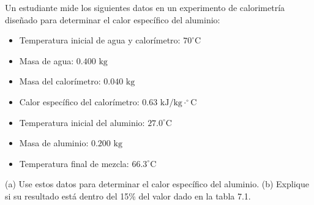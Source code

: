 \item Un estudiante mide los siguientes datos en un experimento de calorimetría diseñado para determinar el calor específico del aluminio:
\begin{itemize}
    \item Temperatura inicial de agua y calorímetro: $70^\circ\text{C}$
    \item Masa de agua: $0.400\text{ kg}$
    \item Masa del calorímetro: $0.040\text{ kg}$
    \item Calor específico del calorímetro: $0.63\text{ kJ/kg}\cdot^\circ\text{C}$
    \item Temperatura inicial del aluminio: $27.0^\circ\text{C}$
    \item Masa de aluminio: $0.200\text{ kg}$
    \item Temperatura final de mezcla: $66.3^\circ\text{C}$
\end{itemize}
(a) Use estos datos para determinar el calor específico del aluminio. (b) Explique si su resultado está dentro del 15\% del valor dado en la tabla 7.1.
